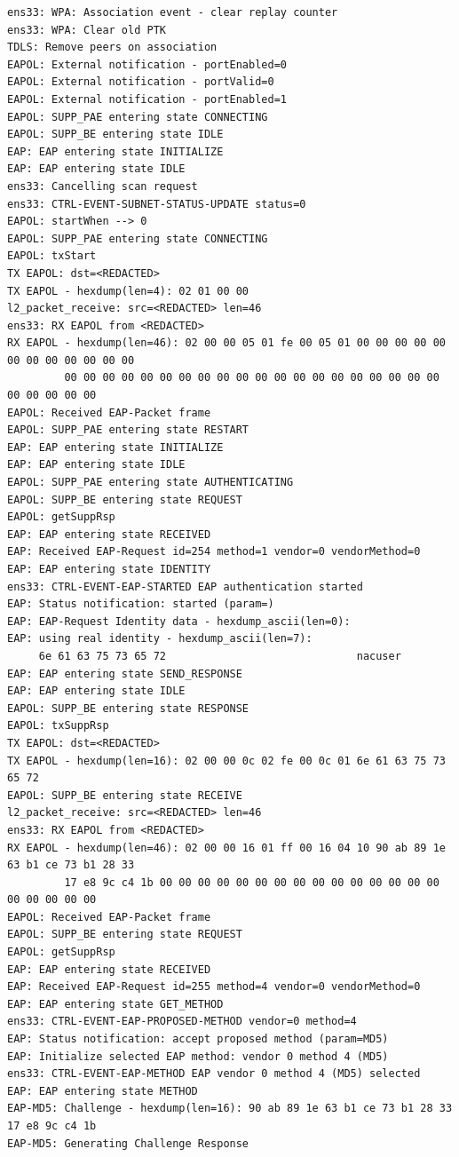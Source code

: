 \documentclass[11pt]{article}
\begin{document}
\begin{verbatim}
ens33: WPA: Association event - clear replay counter
ens33: WPA: Clear old PTK
TDLS: Remove peers on association
EAPOL: External notification - portEnabled=0
EAPOL: External notification - portValid=0
EAPOL: External notification - portEnabled=1
EAPOL: SUPP_PAE entering state CONNECTING
EAPOL: SUPP_BE entering state IDLE
EAP: EAP entering state INITIALIZE
EAP: EAP entering state IDLE
ens33: Cancelling scan request
ens33: CTRL-EVENT-SUBNET-STATUS-UPDATE status=0
EAPOL: startWhen --> 0
EAPOL: SUPP_PAE entering state CONNECTING
EAPOL: txStart
TX EAPOL: dst=<REDACTED>
TX EAPOL - hexdump(len=4): 02 01 00 00
l2_packet_receive: src=<REDACTED> len=46
ens33: RX EAPOL from <REDACTED>
RX EAPOL - hexdump(len=46): 02 00 00 05 01 fe 00 05 01 00 00 00 00 00 00 00 00 00 00 00 00
         00 00 00 00 00 00 00 00 00 00 00 00 00 00 00 00 00 00 00 00 00 00 00 00 00
EAPOL: Received EAP-Packet frame
EAPOL: SUPP_PAE entering state RESTART
EAP: EAP entering state INITIALIZE
EAP: EAP entering state IDLE
EAPOL: SUPP_PAE entering state AUTHENTICATING
EAPOL: SUPP_BE entering state REQUEST
EAPOL: getSuppRsp
EAP: EAP entering state RECEIVED
EAP: Received EAP-Request id=254 method=1 vendor=0 vendorMethod=0
EAP: EAP entering state IDENTITY
ens33: CTRL-EVENT-EAP-STARTED EAP authentication started
EAP: Status notification: started (param=)
EAP: EAP-Request Identity data - hexdump_ascii(len=0):
EAP: using real identity - hexdump_ascii(len=7):
     6e 61 63 75 73 65 72                              nacuser         
EAP: EAP entering state SEND_RESPONSE
EAP: EAP entering state IDLE
EAPOL: SUPP_BE entering state RESPONSE
EAPOL: txSuppRsp
TX EAPOL: dst=<REDACTED>
TX EAPOL - hexdump(len=16): 02 00 00 0c 02 fe 00 0c 01 6e 61 63 75 73 65 72
EAPOL: SUPP_BE entering state RECEIVE
l2_packet_receive: src=<REDACTED> len=46
ens33: RX EAPOL from <REDACTED>
RX EAPOL - hexdump(len=46): 02 00 00 16 01 ff 00 16 04 10 90 ab 89 1e 63 b1 ce 73 b1 28 33
         17 e8 9c c4 1b 00 00 00 00 00 00 00 00 00 00 00 00 00 00 00 00 00 00 00 00
EAPOL: Received EAP-Packet frame
EAPOL: SUPP_BE entering state REQUEST
EAPOL: getSuppRsp
EAP: EAP entering state RECEIVED
EAP: Received EAP-Request id=255 method=4 vendor=0 vendorMethod=0
EAP: EAP entering state GET_METHOD
ens33: CTRL-EVENT-EAP-PROPOSED-METHOD vendor=0 method=4
EAP: Status notification: accept proposed method (param=MD5)
EAP: Initialize selected EAP method: vendor 0 method 4 (MD5)
ens33: CTRL-EVENT-EAP-METHOD EAP vendor 0 method 4 (MD5) selected
EAP: EAP entering state METHOD
EAP-MD5: Challenge - hexdump(len=16): 90 ab 89 1e 63 b1 ce 73 b1 28 33 17 e8 9c c4 1b
EAP-MD5: Generating Challenge Response

\end{verbatim}
\end{document}
